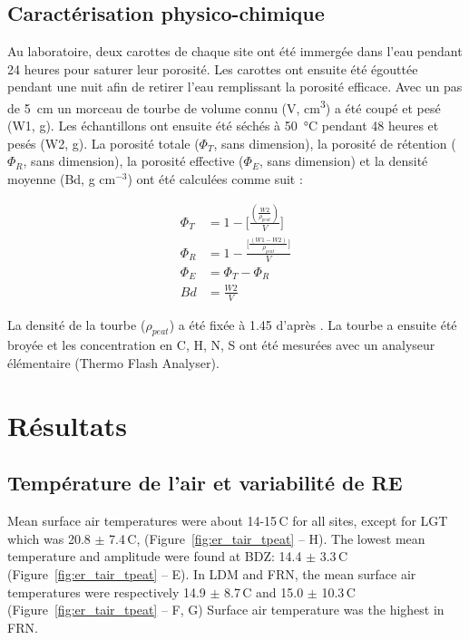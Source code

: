 \subsection{Caractérisation physico-chimique}

Au laboratoire, deux carottes de chaque site ont été immergée dans l'eau pendant 24 heures pour saturer leur porosité.
Les carottes ont ensuite été égouttée pendant une nuit afin de retirer l'eau remplissant la porosité efficace.
Avec un pas de \SI{5}{\centi\metre} un morceau de tourbe de volume connu (V, \si{\cubic\centi\metre}) a été coupé et pesé (W1, \si{\gram}).
Les échantillons ont ensuite été séchés à \SI{50}{\degreeCelsius} pendant 48 heures et pesés (W2, \si{\gram}).
La porosité totale ($\Phi_{T}$, sans dimension), la porosité de rétention  ($\Phi_{R}$, sans dimension), la porosité effective ($\Phi_{E}$, sans dimension) et la densité moyenne (Bd, g cm$^{-3}$) ont été calculées comme suit :

\begin{align}
\Phi_{T} & = 1 - \bigg[\frac{(\frac{W2}{\rho_{peat}})}{V}\bigg] \label{eq_por_tot}\\
\Phi_{R} & = 1 - \frac{\Big[\frac{(W1-W2)}{\rho_{peat}}\Big]}{V} \label{eq_por_ret}\\
\Phi_{E} & = \Phi_{T} - \Phi_{R} \label{eq_pro_eff}\\
Bd & = \frac{W2}{V} \label{eq_bd}
\end{align}

La densité de la tourbe ($\rho_{peat}$) a été fixée à \num{1.45} d'après \citet{kennedy2005}.
La tourbe a ensuite été broyée et les concentration en C, H, N, S ont été mesurées avec un analyseur élémentaire (Thermo Flash Analyser).

\section{Résultats}

\subsection{Température de l'air et variabilité de RE}

Mean surface air temperatures were about 14-15\,\textdegree C for all sites, except for LGT which was 20.8 $\pm$ 7.4\,\textdegree C, (Figure~\ref{fig:er_tair_tpeat} -- H).
The lowest mean temperature and amplitude were found at BDZ: 14.4 $\pm$ 3.3\,\textdegree C (Figure~\ref{fig:er_tair_tpeat} -- E).
In LDM and FRN, the mean surface air temperatures were respectively 14.9 $\pm$ 8.7\,\textdegree C and 15.0 $\pm$ 10.3\,\textdegree C (Figure~\ref{fig:er_tair_tpeat} -- F, G)
Surface air temperature was the highest in FRN.

